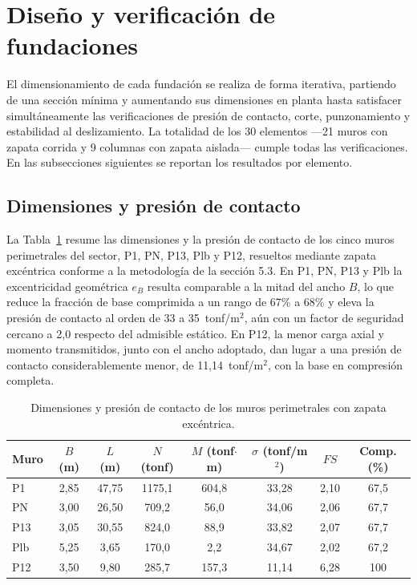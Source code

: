 \section{Diseño y verificación de fundaciones}
El dimensionamiento de cada fundación se realiza de forma iterativa, partiendo de una sección mínima y aumentando sus dimensiones en planta hasta satisfacer simultáneamente las verificaciones de presión de contacto, corte, punzonamiento y estabilidad al deslizamiento. La totalidad de los 30 elementos —21 muros con zapata corrida y 9 columnas con zapata aislada— cumple todas las verificaciones. En las subsecciones siguientes se reportan los resultados por elemento.

\subsection{Dimensiones y presión de contacto}
La Tabla~\ref{tab:excentricos} resume las dimensiones y la presión de contacto de los cinco muros perimetrales del sector, P1, PN, P13, Plb y P12, resueltos mediante zapata excéntrica conforme a la metodología de la sección 5.3. En P1, PN, P13 y Plb la excentricidad geométrica $e_B$ resulta comparable a la mitad del ancho $B$, lo que reduce la fracción de base comprimida a un rango de 67\% a 68\% y eleva la presión de contacto al orden de 33 a 35~tonf/m$^2$, aún con un factor de seguridad cercano a 2,0 respecto del admisible estático. En P12, la menor carga axial y momento transmitidos, junto con el ancho adoptado, dan lugar a una presión de contacto considerablemente menor, de 11,14~tonf/m$^2$, con la base en compresión completa.

\begin{table}[H]
\centering
\caption{Dimensiones y presión de contacto de los muros perimetrales con zapata excéntrica.}
\label{tab:excentricos}
\begin{tabular}{lccccccc}
\hline
Muro & $B$ (m) & $L$ (m) & $N$ (tonf) & $M$ (tonf$\cdot$m) & $\sigma$ (tonf/m$^2$) & $FS$ & Comp. (\%) \\
\hline
P1  & 2,85 & 47,75 & 1175,1 & 604,8 & 33,28 & 2,10 & 67,5 \\
PN  & 3,00 & 26,50 & 709,2  & 56,0  & 34,06 & 2,06 & 67,7 \\
P13 & 3,05 & 30,55 & 824,0  & 88,9  & 33,82 & 2,07 & 67,7 \\
Plb & 5,25 & 3,65  & 170,0  & 2,2   & 34,67 & 2,02 & 67,2 \\
P12 & 3,50 & 9,80  & 285,7  & 157,3 & 11,14 & 6,28 & 100  \\
\hline
\end{tabular}
\end{table}

